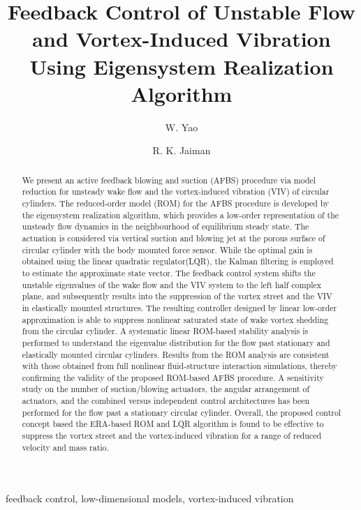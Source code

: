 \documentclass[standard]{jfm}
\title{Feedback Control of Unstable Flow and Vortex-Induced Vibration Using  
       Eigensystem Realization Algorithm}
\author{W. Yao
  \and  R. K. Jaiman
   \corresp{\email{mperkj@nus.edu.sg}}
  }
\affiliation{Department of Mechanical Engineering, National University Singapore, Singapore 119077}
\begin{document}
\maketitle

\begin{abstract}
We present an active feedback blowing and suction (AFBS) procedure 
via model reduction for unsteady wake 
flow and the vortex-induced vibration (VIV) of circular cylinders. 
The reduced-order model (ROM) for the AFBS procedure is developed by 
the eigensystem realization algorithm, which provides a low-order representation of 
the unsteady flow dynamics in the neighbourhood of equilibrium steady state. 
%
The actuation is considered via vertical suction and blowing jet at the porous surface
of circular cylinder with the body mounted force sensor. 
While the optimal gain is obtained using the linear quadratic regulator(LQR),
the Kalman filtering is employed to estimate the approximate state vector. 
%
The feedback control system shifts the unstable eigenvalues of the wake flow and 
the VIV system to the left half complex plane, and subsequently
results into the suppression of the vortex street and the VIV in 
elastically  mounted structures. 
The resulting controller designed by linear low-order approximation is 
able to suppress nonlinear saturated state of wake vortex shedding from the circular cylinder. 
%
A systematic linear ROM-based  stability analysis is performed to understand the eigenvalue 
distribution for the flow past stationary and elastically mounted circular cylinders. 
%
Results from the ROM analysis are consistent with those obtained from full nonlinear 
fluid-structure interaction simulations, thereby confirming the validity of the proposed ROM-based AFBS procedure.
%
A sensitivity study on the number of suction/blowing actuators, 
the angular arrangement of actuators, 
and the combined versus independent control architectures has been performed for the 
flow past a stationary circular cylinder.
%
Overall, the proposed control concept based the ERA-based ROM and LQR algorithm
is found to be effective to suppress the vortex street and 
the vortex-induced vibration for a range of reduced velocity and mass ratio. 

\end{abstract}

\begin{keywords}
feedback control, low-dimensional models, vortex-induced vibration
\end{keywords}
\end{document}
